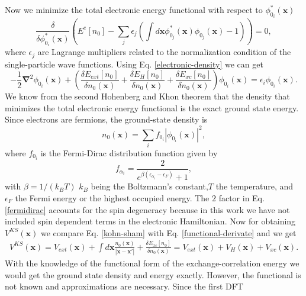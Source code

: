 Now we minimize the total electronic energy functional with respect to $\phi_{0_{i}}^{*}(\mathbf{x})$
\begin{equation}
 \frac{\delta}{\delta\phi_{0_{i}}^{*}(\mathbf{x})}\left(E^{e}[n_{0}]-\sum_{j}\epsilon_{j}(\int{d\mathbf{x}\phi_{0_{j}}^{*}(\mathbf{x})\phi_{0_{j}}(\mathbf{x})-1})\right)=0,
\end{equation}
where $\epsilon_{j}$ are Lagrange multipliers related to the normalization condition of the single-particle wave functions. Using Eq. \ref{electronic-density} we can get
\begin{equation}
\label{functional-derivate}
 -\frac{1}{2}\boldsymbol{\nabla}^{2}\phi_{0_{i}}(\mathbf{x})+\left(\frac{\delta E_{ext}[n_{0}]}{\delta n_{0}(\mathbf{x})}+\frac{\delta E_{H}[n_{0}]}{\delta n_{0}(\mathbf{x})}+\frac{
 \delta E_{xc}[n_{0}]}{\delta n_{0}(\mathbf{x})}\right)\phi_{0_{i}}(\mathbf{x})=\epsilon_{i}\phi_{0_{i}}(\mathbf{x}).
\end{equation}
We know from the second Hohenberg and Khon theorem that the density that minimizes the total electronic energy functional is the exact ground state energy. Since electrons are fermions, the ground-state density is
\begin{equation}
 \label{ground-state-density}
 n_{0}(\mathbf{x})=\sum_{i}f_{0_{i}}|\phi_{0_{i}}(\mathbf{x})|^{2},
\end{equation}
where $f_{0_{i}}$ is the Fermi-Dirac distribution function given by
\begin{equation}
 \label{fermidirac}
 f_{\alpha_{i}}=\frac{2}{e^{\beta(\epsilon_{\alpha_{i}}-\epsilon_{F})}+1},
\end{equation}
with $\beta=1/(k_{B}T)$ $k_{B}$ being the Boltzmann's constant,$T$ the temperature, and $\epsilon_{F}$ the Fermi energy or the highest occupied energy. The $2$ factor in Eq. \ref{fermidirac} accounts for the 
spin degeneracy because in this work we have not included spin dependent terms in the electronic Hamiltonian. Now for obtaining $V^{KS}(\mathbf{x})$ we compare Eq. \ref{kohn-sham} with Eq. \ref{functional-derivate} and we get
\begin{multline}
 V^{KS}(\mathbf{x})=V_{ext}(\mathbf{x})+\int{d\mathbf{x}\frac{n_{0}(\mathbf{x})}{|\mathbf{x}-\mathbf{x}'|}}+\frac{\delta E_{xc}[n_{0}]}{\delta n_{0}(\mathbf{x})}=V_{ext}(\mathbf{x})+V_{H}(\mathbf{x})+V_{xc}(\mathbf{x}).
\end{multline}
With the knowledge of the functional form of the exchange-correlation energy we would get the ground state density and energy exactly. However, the functional is not known and approximations are necessary. Since the first DFT 
